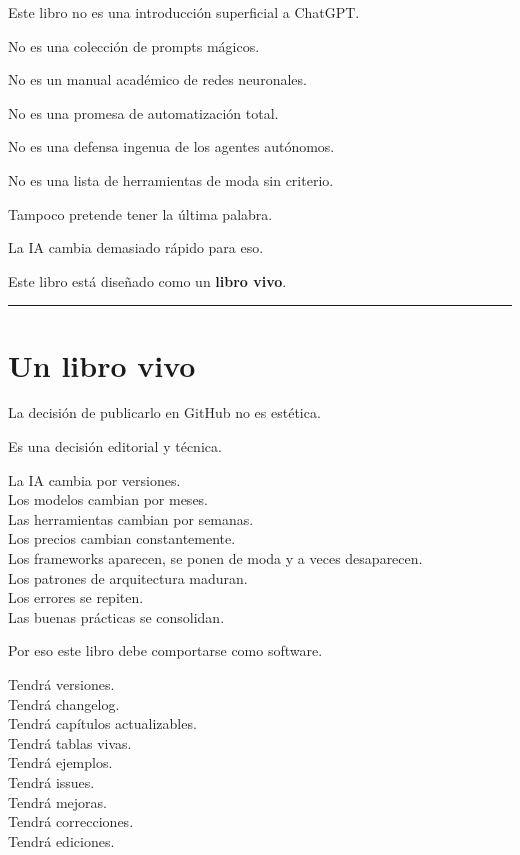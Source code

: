 Este libro no es una introducción superficial a ChatGPT.

No es una colección de prompts mágicos.

No es un manual académico de redes neuronales.

No es una promesa de automatización total.

No es una defensa ingenua de los agentes autónomos.

No es una lista de herramientas de moda sin criterio.

Tampoco pretende tener la última palabra.

La IA cambia demasiado rápido para eso.

Este libro está diseñado como un \textbf{libro vivo}.

\begin{center}\rule{0.5\linewidth}{0.5pt}\end{center}

\section{Un libro vivo}\label{un-libro-vivo}

La decisión de publicarlo en GitHub no es estética.

Es una decisión editorial y técnica.

La IA cambia por versiones.\\
Los modelos cambian por meses.\\
Las herramientas cambian por semanas.\\
Los precios cambian constantemente.\\
Los frameworks aparecen, se ponen de moda y a veces desaparecen.\\
Los patrones de arquitectura maduran.\\
Los errores se repiten.\\
Las buenas prácticas se consolidan.

Por eso este libro debe comportarse como software.

Tendrá versiones.\\
Tendrá changelog.\\
Tendrá capítulos actualizables.\\
Tendrá tablas vivas.\\
Tendrá ejemplos.\\
Tendrá issues.\\
Tendrá mejoras.\\
Tendrá correcciones.\\
Tendrá ediciones.

